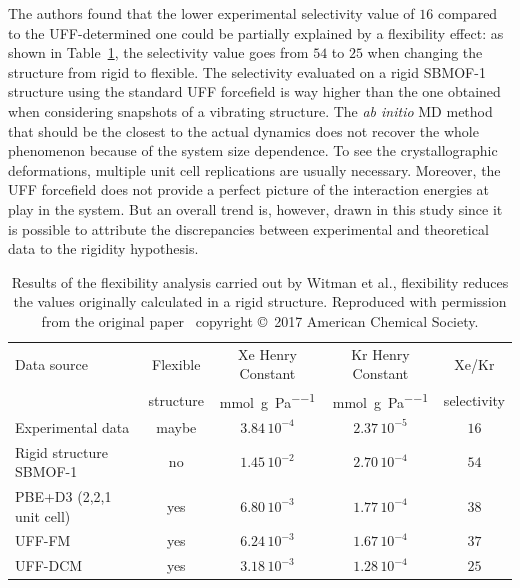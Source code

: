 \documentclass[main]{subfiles}
\begin{document}
The authors found that the lower experimental selectivity value of $16$ compared to the UFF-determined one could be partially explained by a flexibility effect: as shown in Table~\ref{table:witman_sbmof}, the selectivity value goes from $54$ to $25$ when changing the structure from rigid to flexible. The selectivity evaluated on a rigid SBMOF-1 structure using the standard UFF forcefield is way higher than the one obtained when considering snapshots of a vibrating structure. The \emph{ab initio} MD method that should be the closest to the actual dynamics does not recover the whole phenomenon because of the system size dependence. To see the crystallographic deformations, multiple unit cell replications are usually necessary. Moreover, the UFF forcefield does not provide a perfect picture of the interaction energies at play in the system. But an overall trend is, however, drawn in this study since it is possible to attribute the discrepancies between experimental and theoretical data to the rigidity hypothesis.

\begin{table}[t]
  \centering
  \small
  \begin{tabular}{|l|c|c|c|c|}
  \hline
    Data source & Flexible &  Xe Henry Constant &  Kr Henry Constant &  Xe/Kr \\
      & structure &  \si{\mmol\per\g\per\Pa} &  \si{\mmol\per\g\per\Pa} &  selectivity \\
  \hline
    Experimental data\autocite{Banerjee_2016} & maybe &  $3.84\,10^{-4}$ &  $2.37\,10^{-5}$ &  $16$ \\
  \hline
    Rigid structure SBMOF-1\autocite{Banerjee_2016} & no &  $1.45\,10^{-2}$ &  $2.70\,10^{-4}$ &  $54$ \\
    PBE+D3 (2,2,1 unit cell) & yes &  $6.80\,10^{-3}$ &  $1.77\,10^{-4}$ &  $38$ \\
    UFF-FM & yes &  $6.24\,10^{-3}$ &  $1.67\,10^{-4}$ &  $37$ \\
    UFF-DCM & yes &  $3.18\,10^{-3}$ &  $1.28\,10^{-4}$ &  $25$ \\
  \hline
\end{tabular}
\caption{ Results of the flexibility analysis carried out by Witman et al., flexibility reduces the values originally calculated in a rigid structure. Reproduced with permission from the original paper~\cite{Witman_2017} copyright \copyright\ 2017 American Chemical Society.}\label{table:witman_sbmof}
\end{table}
\end{document}
